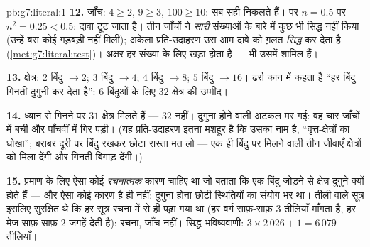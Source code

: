 \begin{solution}{pb:g7:literal:1}
\textbf{12.} जाँच: $4 \geq 2$, $9 \geq 3$, $100 \geq 10$: सब सही
निकलते हैं। पर $n = 0.5$ पर $n^2 = 0.25 < 0.5$: दावा टूट जाता है।
तीन जाँचों ने \emph{सारी} संख्याओं के बारे में कुछ भी सिद्ध नहीं
किया (उन्हें बस कोई गड़बड़ी नहीं मिली); अकेला प्रति-उदाहरण उस आम
दावे को ग़लत \emph{सिद्ध} कर देता है
(\cref{met:g7:literal:test})। अक्षर हर संख्या के लिए खड़ा होता
है ---  भी उसमें शामिल हैं।

\textbf{13.} क्षेत्र: $2$ बिंदु $\to 2$; $3$ बिंदु $\to 4$;
$4$ बिंदु $\to 8$; $5$ बिंदु $\to 16$। ढर्रा कान में कहता है
``हर बिंदु गिनती दुगुनी कर देता है'': $6$ बिंदुओं के लिए $32$
क्षेत्र की उम्मीद।

\textbf{14.} ध्यान से गिनने पर $31$ क्षेत्र मिलते हैं --- $32$
नहीं। दुगुना होने वाली अटकल मर गई: वह चार जाँचों में बची और
पाँचवीं में गिर पड़ी। (यह प्रति-उदाहरण इतना मशहूर है कि उसका नाम
है, ``वृत्त-क्षेत्रों का धोखा''; बराबर दूरी पर बिंदु रखकर छोटा
रास्ता मत लो --- एक ही बिंदु पर मिलने वाली तीन जीवाएँ क्षेत्रों
को मिला देंगी और गिनती बिगाड़ देंगी।)

\textbf{15.} प्रमाण के लिए ऐसा कोई \emph{रचनात्मक} कारण चाहिए था
जो बताता कि एक बिंदु जोड़ने से क्षेत्र दुगुने क्यों होते हैं ---
और ऐसा कोई कारण है ही नहीं: दुगुना होना छोटी स्थितियों का संयोग
भर था। तीली वाले सूत्र इसलिए सुरक्षित थे कि हर सूत्र रचना में से
ही पढ़ा गया था (हर वर्ग साफ़-साफ़ $3$ तीलियाँ माँगता है, हर मेज़
साफ़-साफ़ $2$ जगहें देती है): रचना, जाँच नहीं। सिद्ध भविष्यवाणी:
$3 \times 2\,026 + 1 = 6\,079$ तीलियाँ।

\end{solution}
